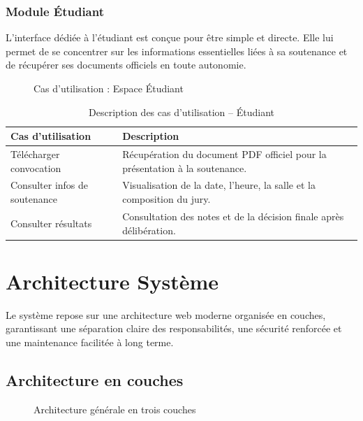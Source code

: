 \documentclass[12pt,a4paper]{article}
\begin{document}
\subsubsection{Module Étudiant}

L'interface dédiée à l'étudiant est conçue pour être simple et directe. Elle lui permet de se concentrer sur les informations essentielles liées à sa soutenance et de récupérer ses documents officiels en toute autonomie.

\begin{figure}[H]
    \centering
    \caption{Cas d'utilisation : Espace Étudiant}
\end{figure}

\begin{table}[H]
    \centering
    \small
    \begin{tabular}{lp{10cm}}
        \toprule
        \rowcolor{primary!10}
        \textbf{Cas d'utilisation}    & \textbf{Description}                                                        \\
        \midrule
        Télécharger convocation       & Récupération du document PDF officiel pour la présentation à la soutenance. \\
        \addlinespace
        Consulter infos de soutenance & Visualisation de la date, l'heure, la salle et la composition du jury.      \\
        \addlinespace
        Consulter résultats           & Consultation des notes et de la décision finale après délibération.         \\
        \bottomrule
    \end{tabular}
    \caption{Description des cas d'utilisation -- Étudiant}
\end{table}

\newpage
\section{Architecture Système}

Le système repose sur une architecture web moderne organisée en couches, garantissant une séparation claire des responsabilités, une sécurité renforcée et une maintenance facilitée à long terme.

\subsection{Architecture en couches}

\begin{figure}[H]
    \centering
    \caption{Architecture générale en trois couches}
\end{figure}
\end{document}
